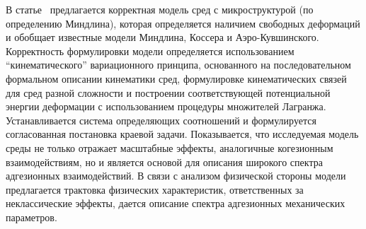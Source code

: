 

В статье~\cite{Belov} предлагается корректная модель сред с микроструктурой (по определению Миндлина), которая определяется наличием свободных деформаций и обобщает известные модели Миндлина, Коссера и Аэро-Кувшинского. Корректность формулировки модели определяется использованием ``кинематического'' вариационного принципа, основанного на последовательном формальном описании кинематики сред, формулировке кинематических связей для сред разной сложности и построении соответствующей потенциальной энергии деформации с использованием процедуры множителей Лагранжа. Ус\-та\-нав\-ли\-ва\-ет\-ся система определяющих соотношений и формулируется согласованная постановка краевой задачи. Показывается, что исследуемая модель среды не только отражает масштабные эффекты, аналогичные когезионным взаимодействиям, но и является основой для описания широкого спектра адгезионных взаимодействий. В связи с анализом физической стороны модели предлагается трактовка физических характеристик, ответственных за неклассические эффекты, дается описание спектра адгезионных механических параметров.

